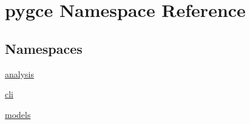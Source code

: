 \hypertarget{namespacepygce}{}\section{pygce Namespace Reference}
\label{namespacepygce}
\subsection*{Namespaces}
\begin{DoxyCompactItemize}
\item 
 \hyperlink{namespacepygce_1_1analysis}{analysis}
\item 
 \hyperlink{namespacepygce_1_1cli}{cli}
\item 
 \hyperlink{namespacepygce_1_1models}{models}
\end{DoxyCompactItemize}
